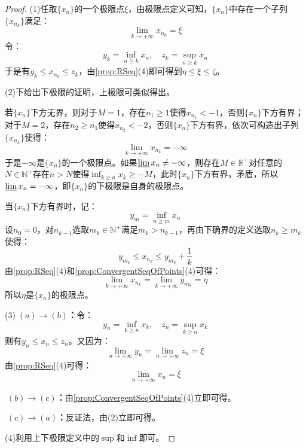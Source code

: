 \begin{proof}
	(1)任取$\{x_n\}$的一个极限点$\xi$，由极限点定义可知，$\{x_n\}$中存在一个子列$\{x_{n_k}\}$满足：
	\begin{equation*}
		\lim_{k\to+\infty}x_{n_k}=\xi
	\end{equation*}
	令：
	\begin{equation*}
		y_k=\inf_{n\geqslant k}x_n,\quad
		z_k=\sup_{n\geqslant k}x_n
	\end{equation*}
	于是有$y_k\leqslant x_{n_k}\leqslant z_k$，由\cref{prop:RSeq}(4)即可得到$\eta\leqslant\xi\leqslant\zeta$。\par
	(2)下给出下极限的证明，上极限可类似得出。\par
	若$\{x_n\}$下方无界，则对于$M=1$，存在$n_1\geqslant1$使得$x_{n_1}<-1$，否则$\{x_n\}$下方有界；对于$M=2$，存在$n_2\geqslant n_1$使得$x_{n_2}<-2$，否则$\{x_n\}$下方有界，依次可构造出子列$\{x_{n_k}\}$使得：
	\begin{equation*}
		\lim_{k\to+\infty}x_{n_k}=-\infty
	\end{equation*}
	于是$-\infty$是$\{x_n\}$的一个极限点。如果$\varliminf x_n\ne-\infty$，则存在$M\in\mathbb{R}^{+}$对任意的$N\in\mathbb{N}^+$存在$n>N$使得$\inf_{k\geqslant n}x_k\geqslant-M$，此时$\{x_n\}$下方有界，矛盾，所以$\varliminf  x_n=-\infty$，即$\{x_n\}$的下极限是自身的极限点。\par
	当$\{x_n\}$下方有界时，记：
	\begin{equation*}
		y_m=\inf_{n\geqslant m}x_n
	\end{equation*}
	设$n_0=0$，对$n_{k-1}$选取$m_k\in\mathbb{N}^+$满足$m_k>n_{k-1}$，再由下确界的定义选取$n_k\geqslant m_k$使得：
	\begin{equation*}
		y_{m_k}\leqslant x_{n_k}\leqslant y_{m_k}+\frac{1}{k}
	\end{equation*}
	由\cref{prop:RSeq}(4)和\cref{prop:ConvergentSeqOfPoints}(4)可得：
	\begin{equation*}
		\lim_{k\to+\infty}x_{n_k}=\lim_{k\to+\infty}y_{m_k}=\eta
	\end{equation*}
	所以$\eta$是$\{x_n\}$的极限点。\par
	(3)\textbf{$\;(a)\rightarrow(b)$：}令：
	\begin{equation*}
		y_n=\inf_{k\geqslant n}x_k,\quad
		z_n=\sup_{k\geqslant n}x_k
	\end{equation*}
	则有$y_n\leqslant x_n\leqslant z_n$。又因为：
	\begin{equation*}
		\lim_{n\to+\infty}y_n=\lim_{n\to+\infty}z_n=\xi
	\end{equation*}
	由\cref{prop:RSeq}(4)可得：
	\begin{equation*}
		\lim_{n\to+\infty}x_n=\xi
	\end{equation*}\par
	\textbf{$\;(b)\rightarrow(c)$：}由\cref{prop:ConvergentSeqOfPoints}(4)立即可得。\par
	\textbf{$\;(c)\rightarrow(a)$：}反证法，由(2)立即可得。\par
	(4)利用上下极限定义中的$\sup$和$\inf$即可。
\end{proof}

